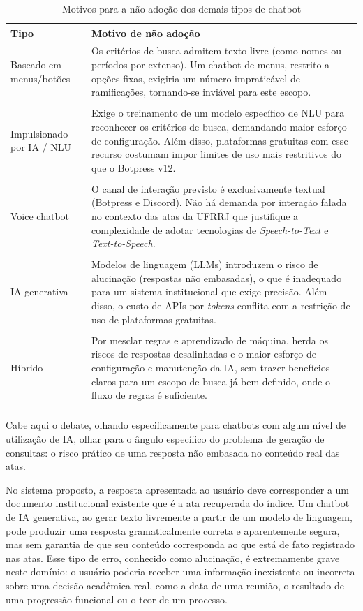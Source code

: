 \begin{table}[H]
  \centering
  \caption{Motivos para a não adoção dos demais tipos de chatbot}
  \label{tab:motivos-nao-adocao}
  \begin{tabular}{p{3.2cm}p{9.6cm}}
    \hline
    \textbf{Tipo} & \textbf{Motivo de não adoção} \\
    \hline
    Baseado em menus/botões & Os critérios de busca admitem texto livre (como nomes ou períodos por extenso). Um chatbot de menus, restrito a opções fixas, exigiria um número impraticável de ramificações, tornando-se inviável para este escopo. \\\\
    Impulsionado por IA / NLU & Exige o treinamento de um modelo específico de NLU para reconhecer os critérios de busca, demandando maior esforço de configuração. Além disso, plataformas gratuitas com esse recurso costumam impor limites de uso mais restritivos do que o Botpress v12. \\\\
    Voice chatbot & O canal de interação previsto é exclusivamente textual (Botpress e Discord). Não há demanda por interação falada no contexto das atas da UFRRJ que justifique a complexidade de adotar tecnologias de \textit{Speech-to-Text} e \textit{Text-to-Speech}. \\\\
    IA generativa &Modelos de linguagem (LLMs) introduzem o risco de alucinação (respostas não embasadas), o que é inadequado para um sistema institucional que exige precisão. Além disso, o custo de APIs por \textit{tokens} conflita com a restrição de uso de plataformas gratuitas. \\\\
    Híbrido & Por mesclar regras e aprendizado de máquina, herda os riscos de respostas desalinhadas e o maior esforço de configuração e manutenção da IA, sem trazer benefícios claros para um escopo de busca já bem definido, onde o fluxo de regras é suficiente. \\\\
    \hline
  \end{tabular}
\end{table}


Cabe aqui o debate, olhando especificamente para chatbots com algum nível de utilização de IA, olhar para o ângulo específico do problema de geração de consultas: o risco prático de uma resposta não embasada no conteúdo real das atas.

No sistema proposto, a resposta apresentada ao usuário deve corresponder a um documento institucional existente que é a ata recuperada do índice. Um chatbot de IA generativa, ao gerar texto livremente a partir de um modelo de linguagem, pode produzir uma resposta gramaticalmente correta e aparentemente segura, mas sem garantia de que seu conteúdo corresponda ao que está de fato registrado nas atas. Esse tipo de erro, conhecido como alucinação, é extremamente grave neste domínio: o usuário poderia receber uma informação inexistente ou incorreta sobre uma decisão acadêmica real, como a data de uma reunião, o resultado de uma progressão funcional ou o teor de um processo.

